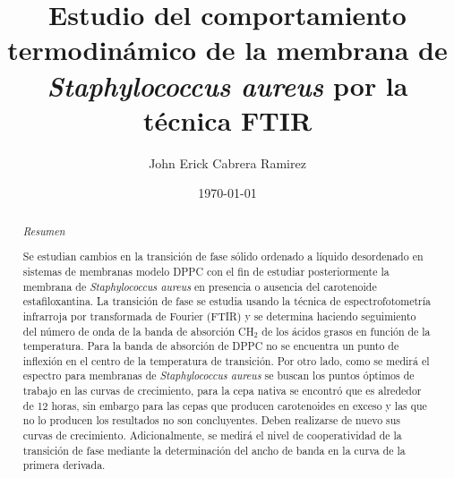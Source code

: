 \documentclass[%
 reprint,
 amsmath,amssymb,
 aps,
]{revtex4-1}
\begin{document}
\title{Estudio del comportamiento termodinámico de la membrana de \textit{Staphylococcus aureus} por la técnica FTIR}%

\author{John Erick Cabrera Ramirez}


\date{\today}%

\begin{abstract}
\begin{center}
  \textit{Resumen}  
\end{center}

Se estudian cambios en la transición de fase sólido ordenado a líquido desordenado en sistemas de membranas modelo DPPC con el fin de estudiar posteriormente la membrana de  \textit{Staphylococcus aureus} en presencia o ausencia del carotenoide estafiloxantina. La transición de fase se estudia usando la técnica de espectrofotometría infrarroja por transformada de Fourier (FTIR) y se determina haciendo seguimiento del número de onda de la banda de absorción CH$_{2}$ de los ácidos grasos en función de la temperatura. Para la banda de absorción de DPPC no se encuentra un punto de inflexión en el centro de la temperatura de transición. Por otro lado, como se medirá el espectro para membranas de \textit{Staphylococcus aureus} se buscan los puntos óptimos de trabajo en las curvas de crecimiento, para la cepa nativa se encontró que es alrededor de 12 horas, sin embargo para las cepas que producen carotenoides en exceso y las que no lo producen los resultados no son concluyentes. Deben realizarse de nuevo sus curvas de crecimiento. Adicionalmente, se medirá el nivel de cooperatividad de la transición de fase mediante la  determinación del ancho de banda en la curva de la primera derivada.

\end{abstract}

\maketitle
\end{document}
